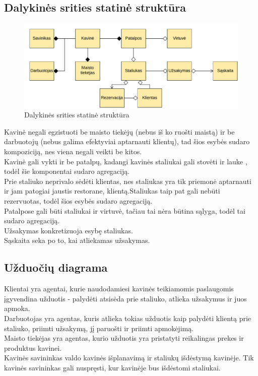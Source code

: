 \documentclass{VUMIFPSkursinis}
\begin{document}
\begin{landscape}
\subsection{Dalykinės srities statinė struktūra}

	\begin {figure}[H]
	\centering
		\caption{Dalykinės srities statinė struktūra}
		\includegraphics[scale=1]{img/3lab/Diagrama1}
		
		\label{fig:ER}
	\end{figure}
\end{landscape}

Kavinė negali egzistuoti be maisto tiekėjų (nebus iš ko ruošti maistą) ir be darbuotojų (nebus galima efektyviai aptarnauti klientų), tad šios esybės sudaro kompoziciją, nes viena negali veikti be kitos.\\
Kavinė gali vykti ir be patalpų, kadangi kavinės staliukai gali stovėti ir 
lauke , todėl šie komponentai sudaro agregaciją.\\
Prie  staliuko  neprivalo  sėdėti  klientas,  nes
staliukas  yra  tik  priemonė  aptarnauti ir jam patogiai jaustis restorane,
klientą.Staliukas taip pat gali nebūti rezervuotas, todėl šios esybės sudaro agregaciją.\\
Patalpose gali būti staliukai ir virtuvė, tačiau tai nėra būtina sąlyga, todėl tai sudaro 
agregaciją.\\
Užsakymas konkretizuoja esybę staliukas.\\
Sąskaita seka po to, kai atliekamas užsakymas.\\

\subsection{Užduočių diagrama}
Klientai  yra  agentai,  kurie  naudodamiesi  kavinės  teikiamomis 
paslaugomis  įgyvendina  užduotis - palydėti  atsisėda  prie  staliuko,  atlieka  užsakymus  ir  juos apmoka. \\
Darbuotojas yra agentas, kuris atlieka tokias užduotis kaip palydėti klientą prie staliuko, 
priimti užsakymą, jį paruošti ir priimti apmokėjimą.\\
Maisto tiekėjas yra agentas, kurio užduotis yra pristatyti reikalingas prekes ir produktus kavinei.\\
Kavinės savininkas valdo kavinės išplanavimą ir staliukų išdėstymą kavinėje. Tik kavinės savininkas gali nuspręsti, kur kavinėje bus išdėstomi staliukai.\\
\end{document}
